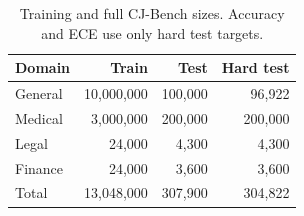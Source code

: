 \begin{table}[t]
\centering
\footnotesize
\setlength{\tabcolsep}{4pt}
\caption{Training and full CJ-Bench sizes. Accuracy and ECE use only hard test targets.}
\label{tab:data}
\begin{tabular}{lrrr}
\toprule
Domain & Train & Test & Hard test \\
\midrule
General & 10,000,000 & 100,000 & 96,922 \\
Medical & 3,000,000 & 200,000 & 200,000 \\
Legal & 24,000 & 4,300 & 4,300 \\
Finance & 24,000 & 3,600 & 3,600 \\
Total & 13,048,000 & 307,900 & 304,822 \\
\bottomrule
\end{tabular}
\end{table}
